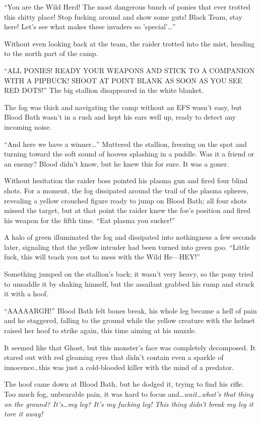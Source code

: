 ``You are the Wild Herd! The most dangerous bunch of ponies that ever trotted this shitty place! Stop fucking around and show some guts! Black Team, stay here! Let's see what makes these invaders so 'special'\dots''

Without even looking back at the team, the raider trotted into the mist, heading to the north part of the camp.

``ALL PONIES! READY YOUR WEAPONS AND STICK TO A COMPANION WITH A PIPBUCK! SHOOT AT POINT BLANK AS SOON AS YOU SEE RED DOTS!'' The big stallion disappeared in the white blanket.

The fog was thick and navigating the camp without an EFS wasn't easy, but Blood Bath wasn't in a rush and kept his ears well up, ready to detect any incoming noise.

``And here we have a winner\dots'' Muttered the stallion, freezing on the spot and turning toward the soft sound of hooves splashing in a puddle. Was it a friend or an enemy? Blood didn't know, but he knew this for sure. It was a goner.

Without hesitation the raider boss pointed his plasma gun and fired four blind shots. For a moment, the fog dissipated around the trail of the plasma spheres, revealing a yellow crouched figure ready to jump on Blood Bath; all four shots missed the target, but at that point the raider knew the foe's position and fired his weapon for the fifth time. ``Eat plasma you sucker!''

A halo of green illuminated the fog and dissipated into nothingness a few seconds later, signaling that the yellow intruder had been turned into green goo. ``Little fuck, this will teach you not to mess with the Wild He---HEY!''

Something jumped on the stallion's back; it wasn't very heavy, so the pony tried to unsaddle it by shaking himself, but the assailant grabbed his rump and struck it with a hoof.

``AAAAARGH!'' Blood Bath felt bones break, his whole leg became a hell of pain and he staggered, falling to the ground while the yellow creature with the helmet raised her hoof to strike again, this time aiming at his muzzle.

It seemed like that Ghost, but this monster's face was completely decomposed. It stared out with red gleaming eyes that didn't contain even a sparkle of innocence\dots this was just a cold-blooded killer with the mind of a predator.

The hoof came down at Blood Bath, but he dodged it, trying to find his rifle. Too much fog, unbearable pain, it was hard to focus and\dots \emph{wait\dots what's that thing on the ground? It's\dots my leg? It's my fucking leg! This thing didn't break} \emph{my leg it} \emph{tore it away!}

